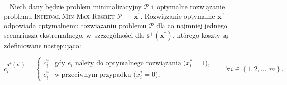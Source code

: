 \begin{theorem}\label{th:intminmaxreg2}~\cite[$432$]{minmaxSurvey}
	Niech dany będzie problem minimalizacyjny $\mathcal{P}$ i~optymalne rozwiązanie problemu \textsc{Interval Min-Max Regret $\mathcal{P}$} --- $\textbf{x}^{\ast}$.
	Rozwiązanie optymalne $\textbf{x}^{\ast}$ odpowiada optymalnemu rozwiązaniu problemu $\mathcal{P}$ dla co najmniej jednego scenariusza ekstremalnego, w~szczególności dla $\textbf{s}^{+} \left( \textbf{x}^{\ast} \right)$, którego koszty są zdefiniowane następująco:
	
	\begin{equation}
		c^{\textbf{s}^{+} \left( \textbf{x}^{\ast} \right)}_{i} = \left\{\begin{matrix}
			c^{\underline{\textbf{s}}}_{i} & \text{gdy $e_{i}$ należy do optymalnego rozwiązania ($x^{\ast}_{i} = 1$),}\\ 
			c^{\underline{\textbf{s}}}_{i} &  \text{w przeciwnym przypadku ($x^{\ast}_{i} = 0$),}
		\end{matrix}\right. \qquad \forall i \in \left\{ 1, 2, \dots, m \right\}\text{.}
	\end{equation}
\end{theorem}

